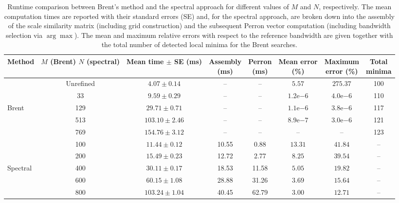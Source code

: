 \begin{table}[p]
    \centering
    \footnotesize
    \setlength{\tabcolsep}{3pt}
    \begin{tabular}{lccccccc}
        \toprule
        Method & \shortstack{$M$ (Brent)\\$N$ (spectral)}
        & \shortstack{Mean time\\$\pm$ SE (ms)}
        & \shortstack{Assembly\\(ms)}
        & \shortstack{Perron\\(ms)}
        & \shortstack{Mean error\\(\%)}
        & \shortstack{Maximum\\error (\%)}
        & \shortstack{Total\\minima} \\
        \midrule
        & Unrefined
        & $4.07 \pm 0.14$ & -- & --
        & $5.57$ & $275.37$ & 100 \\
        & 33
        & $9.59 \pm 0.29$ & -- & --
        & $1.2\mathrm{e}{-6}$ & $4.0\mathrm{e}{-6}$ & 110 \\
        Brent & 129
        & $29.71 \pm 0.71$ & -- & --
        & $1.1\mathrm{e}{-6}$ & $3.8\mathrm{e}{-6}$ & 117 \\
        & 513
        & $103.10 \pm 2.46$ & -- & --
        & $8.9\mathrm{e}{-7}$ & $3.0\mathrm{e}{-6}$ & 121 \\
        & 769
        & $154.76 \pm 3.12$ & -- & --
        & -- & -- & 123 \\
        \midrule
        & 100
        & $11.44 \pm 0.12$ & 10.55 & 0.88
        & $13.31$ & $41.84$ & -- \\
        & 200
        & $15.49 \pm 0.23$ & 12.72 & 2.77
        & $8.25$ & $39.54$ & -- \\
        Spectral & 400
        & $30.11 \pm 0.17$ & 18.53 & 11.58
        & $5.05$ & $19.82$ & -- \\
        & 600
        & $60.15 \pm 1.08$ & 28.88 & 31.26
        & $3.69$ & $15.64$ & -- \\
        & 800
        & $103.24 \pm 1.04$ & 40.45 & 62.79
        & $3.00$ & $12.71$ & -- \\
        \bottomrule
    \end{tabular}
    \caption{Runtime comparison between Brent's method and the spectral approach for different values of $M$ and $N$, respectively. The mean computation times are reported with their standard errors (SE) and, for the spectral approach, are broken down into the assembly of the scale similarity matrix (including grid construction) and the subsequent Perron vector computation (including bandwidth selection via $\arg\max$). The mean and maximum relative errors with respect to the reference bandwidth are given together with the total number of detected local minima for the Brent searches.}
    \label{tab:brent_spectral_timing}
\end{table}

